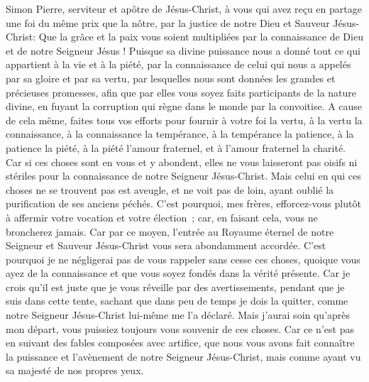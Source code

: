 \begin{multicols}{2}
\VerseOne{}Simon Pierre, serviteur et apôtre de Jésus-Christ, à vous qui avez reçu en partage une foi du même prix que la nôtre, par la justice de notre Dieu et Sauveur Jésus-Christ:
Que la grâce et la paix vous soient multipliées par la connaissance de Dieu et de notre Seigneur Jésus !
Puisque sa divine puissance nous a donné tout ce qui appartient à la vie et à la piété, par la connaissance de celui qui nous a appelés par sa gloire et par sa vertu,
par lesquelles nous sont données les grandes et précieuses promesses, afin que par elles vous soyez faits participants de la nature divine, en fuyant la corruption qui règne dans le monde par la convoitise.
A cause de cela même, faites tous vos efforts pour fournir à votre foi la vertu, à la vertu la connaissance,
à la connaissance la tempérance, à la tempérance la patience, à la patience la piété,
à la piété l'amour fraternel, et à l'amour fraternel la charité.
Car si ces choses sont en vous et y abondent, elles ne vous laisseront pas oisifs ni stériles pour la connaissance de notre Seigneur Jésus-Christ.
Mais celui en qui ces choses ne se trouvent pas est aveugle, et ne voit pas de loin, ayant oublié la purification de ses anciens péchés.
C'est pourquoi, mes frères, efforcez-vous plutôt à affermir votre vocation et votre élection~; car, en faisant cela, vous ne broncherez jamais.
Car par ce moyen, l'entrée au Royaume éternel de notre Seigneur et Sauveur Jésus-Christ vous sera abondamment accordée.
C'est pourquoi je ne négligerai pas de vous rappeler sans cesse ces choses, quoique vous ayez de la connaissance et que vous soyez fondés dans la vérité présente.
Car je crois qu'il est juste que je vous réveille par des avertissements, pendant que je suis dans cette tente,
sachant que dans peu de temps je dois la quitter, comme notre Seigneur Jésus-Christ lui-même me l'a déclaré.
Mais j'aurai soin qu'après mon départ, vous puissiez toujours vous souvenir de ces choses.
Car ce n'est pas en suivant des fables composées avec artifice, que nous vous avons fait connaître la puissance et l'avènement de notre Seigneur Jésus-Christ, mais comme ayant vu sa majesté de nos propres yeux.

\end{multicols}
